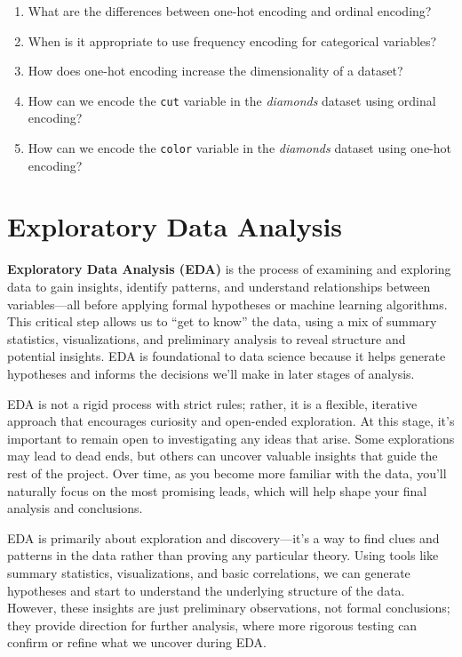 \documentclass[
]{book}
\newcommand{\passthrough}[1]{#1}
\theoremstyle{definition}
\theoremstyle{definition}
\theoremstyle{definition}
\theoremstyle{definition}
\theoremstyle{remark}
\begin{document}
\begin{enumerate}
\item
  What are the differences between one-hot encoding and ordinal encoding?
\item
  When is it appropriate to use frequency encoding for categorical variables?
\item
  How does one-hot encoding increase the dimensionality of a dataset?
\item
  How can we encode the \passthrough{\lstinline!cut!} variable in the \emph{diamonds} dataset using ordinal encoding?
\item
  How can we encode the \passthrough{\lstinline!color!} variable in the \emph{diamonds} dataset using one-hot encoding?
\end{enumerate}

\chapter{Exploratory Data Analysis}\label{chapter-EDA}

\textbf{Exploratory Data Analysis (EDA)} is the process of examining and exploring data to gain insights, identify patterns, and understand relationships between variables---all before applying formal hypotheses or machine learning algorithms. This critical step allows us to ``get to know'' the data, using a mix of summary statistics, visualizations, and preliminary analysis to reveal structure and potential insights. EDA is foundational to data science because it helps generate hypotheses and informs the decisions we'll make in later stages of analysis.

EDA is not a rigid process with strict rules; rather, it is a flexible, iterative approach that encourages curiosity and open-ended exploration. At this stage, it's important to remain open to investigating any ideas that arise. Some explorations may lead to dead ends, but others can uncover valuable insights that guide the rest of the project. Over time, as you become more familiar with the data, you'll naturally focus on the most promising leads, which will help shape your final analysis and conclusions.

EDA is primarily about exploration and discovery---it's a way to find clues and patterns in the data rather than proving any particular theory. Using tools like summary statistics, visualizations, and basic correlations, we can generate hypotheses and start to understand the underlying structure of the data. However, these insights are just preliminary observations, not formal conclusions; they provide direction for further analysis, where more rigorous testing can confirm or refine what we uncover during EDA.
\end{document}
